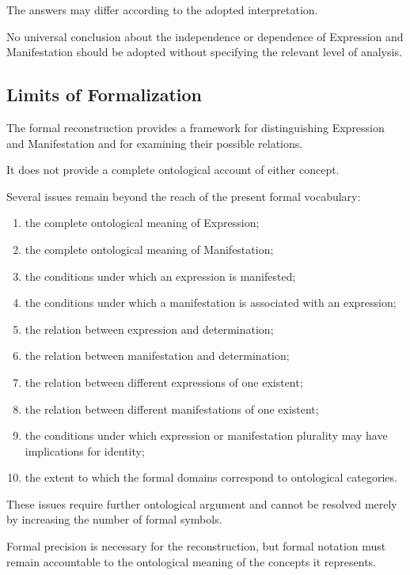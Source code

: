 The answers may differ
according to the adopted
interpretation.

No universal conclusion
about the independence
or dependence of
Expression and Manifestation
should be adopted
without specifying
the relevant level
of analysis.

\subsection{Limits of Formalization}

The formal reconstruction
provides a framework
for distinguishing
Expression and Manifestation
and for examining
their possible relations.

It does not provide
a complete ontological
account of either concept.

Several issues remain
beyond the reach of
the present formal
vocabulary:

\begin{enumerate}
    \item the complete
    ontological meaning
    of Expression;
    \item the complete
    ontological meaning
    of Manifestation;
    \item the conditions
    under which an
    expression is manifested;
    \item the conditions
    under which a
    manifestation is
    associated with
    an expression;
    \item the relation
    between expression
    and determination;
    \item the relation
    between manifestation
    and determination;
    \item the relation
    between different
    expressions of
    one existent;
    \item the relation
    between different
    manifestations of
    one existent;
    \item the conditions
    under which expression
    or manifestation
    plurality may have
    implications for
    identity;
    \item the extent
    to which the formal
    domains correspond
    to ontological
    categories.
\end{enumerate}

These issues require
further ontological
argument and cannot
be resolved merely
by increasing the
number of formal
symbols.

Formal precision
is necessary for
the reconstruction,
but formal notation
must remain accountable
to the ontological
meaning of the
concepts it represents.

